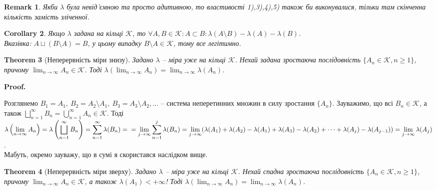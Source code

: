 \documentclass[a4paper, 10pt]{article}
\makeatletter
\theoremstyle{theoremdd}
\newtheorem{theorem}{Theorem}[subsection]
\newtheorem{remark}[theorem]{Remark}
\newtheorem{corollary}[theorem]{Corollary}
\renewenvironment{proof}[1][Proof.\\]{\par
\pushQED{\hfill \qed}%
\normalfont \topsep6\p@\@plus6\p@\relax
\trivlist
\item\relax
{\bfseries
#1\@addpunct{.}}\hspace\labelsep\ignorespaces
}{%
\popQED\endtrivlist\@endpefalse
}
\makeatother
\begin{document}
\begin{remark}
Якби $\lambda$ була невід'ємною та просто адитивною, то властивості 1),3),4),5) також би виконувалися, тільки там скінченна кількість замість зліченної.
\end{remark}

\begin{corollary}
Якщо $\lambda$ задана на кільці $\mathcal{K}$, то $\forall A,B \in \mathcal{K}: A \subset B: \lambda(A \setminus B) - \lambda(A) - \lambda(B)$.\\
\textit{Вказівка: $A \sqcup (B \setminus A) = B$, у цьому випадку $B \setminus A \in \mathcal{K}$, тому все легітимно.}
\end{corollary}

\begin{theorem}[Неперервність міри знизу]
Задано $\lambda$ -- міра уже на кільці $\mathcal{K}$. Нехай задана зростаюча послідовність $\{A_n \in \mathcal{K}, n \geq 1\}$, причому $\displaystyle\lim_{n \to \infty} A_n \in \mathcal{K}$. Тоді $\displaystyle\lambda\left(\lim_{n \to \infty} A_n\right) = \lim_{n \to \infty} \lambda(A_n)$.
\end{theorem}

\begin{proof}
Розглянемо $B_1 = A_1,\ B_2 = A_2 \setminus A_1,\ B_3 = A_3 \setminus A_2, \dots$ -- система неперетинних множин в силу зростання $\{A_n\}$. Зауважимо, що всі $B_n \in \mathcal{K}$, а також $\displaystyle\bigsqcup_{n=1}^\infty B_n = \bigcup_{n=1}^\infty A_n \in \mathcal{K}$. Тоді\\
$\displaystyle\lambda\left(\lim_{n \to \infty} A_n\right) = \lambda\left( \bigsqcup_{n=1}^\infty B_n \right) = \sum_{n=1}^\infty \lambda(B_n) = \\ =\lim_{j \to \infty} \sum_{n=1}^j \lambda(B_n) = \lim_{j \to \infty} (\lambda(A_1) + \lambda(A_2) - \lambda(A_1) + \lambda(A_3) - \lambda(A_2) + \dots + \lambda(A_j) - \lambda(A_{j-1})) = \lim_{j \to \infty} \lambda(A_j)$.\\
Мабуть, окремо зауважу, що в сумі я скористався наслідком вище.
\end{proof}

\begin{theorem}[Неперервність міри зверху]
Задано $\lambda$ -- міра уже на кільці $\mathcal{K}$. Нехай спадна зростаюча послідовність $\{A_n \in \mathcal{K}, n \geq 1\}$, причому $\displaystyle\lim_{n \to \infty} A_n \in \mathcal{K}$, а також $\lambda(A_1) < +\infty$! Тоді $\displaystyle\lambda\left(\lim_{n \to \infty} A_n\right) = \lim_{n \to \infty} \lambda(A_n)$.
\end{theorem}
\end{document}
